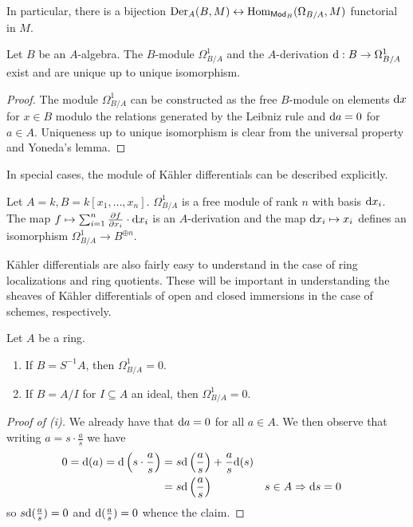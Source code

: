 In particular, there is a bijection $\mathrm{Der}_{A}(B,M)\leftrightarrow\mathrm{Hom}_{\mathsf{Mod}_{B}}(\Omega_{B/A},M)$ functorial in $M$. 
\begin{proposition}\label{prop: uniqueness of differentials}
    Let $B$ be an $A$-algebra. The $B$-module $\Omega^{1}_{B/A}$ and the $A$-derivation $\mathrm{d}:B\to\Omega^{1}_{B/A}$ exist and are unique up to unique isomorphism. 
\end{proposition}
\begin{proof}
    The module $\Omega^{1}_{B/A}$ can be constructed as the free $B$-module on elements $\mathrm{d} x$ for $x\in B$ modulo the relations generated by the Leibniz rule and $\mathrm{d} a=0$ for $a\in A$. Uniqueness up to unique isomorphism is clear from the universal property and Yoneda's lemma. 
\end{proof}
In special cases, the module of K\"{a}hler differentials can be described explicitly. 
\begin{example}
    Let $A=k,B=k[x_{1},\dots,x_{n}]$. $\Omega_{B/A}^{1}$ is a free module of rank $n$ with basis $\mathrm{d} x_{i}$. The map $f\mapsto\sum_{i=1}^{n}\frac{\partial f}{\partial x_{i}}\cdot \mathrm{d} x_{i}$ is an $A$-derivation and the map $\mathrm{d} x_{i}\mapsto x_{i}$ defines an isomorphism $\Omega_{B/A}^{1}\to B^{\oplus n}$. 
\end{example}
K\"{a}hler differentials are also fairly easy to understand in the case of ring localizations and ring quotients. These will be important in understanding the sheaves of K\"{a}hler differentials of open and closed immersions in the case of schemes, respectively. 
\begin{proposition}\label{prop: differentials of open and closed immersions}
    Let $A$ be a ring. 
    \begin{enumerate}[label=(\roman*)]
        \item If $B=S^{-1}A$, then $\Omega^{1}_{B/A}=0$. 
        \item If $B=A/I$ for $I\subseteq A$ an ideal, then $\Omega^{1}_{B/A}=0$. 
    \end{enumerate}
\end{proposition}
\begin{proof}[Proof of (i)]
    We already have that $\mathrm{d} a=0$ for all $a\in A$. We then observe that writing $a=s\cdot\frac{a}{s}$ we have 
    \begin{align*}
        0=\mathrm{d}(a)=\mathrm{d}\left(s\cdot\frac{a}{s}\right) &= s\mathrm{d}\left(\frac{a}{s}\right)+\frac{a}{s}\mathrm{d}(s) \\
        &= s\mathrm{d}\left(\frac{a}{s}\right) && s\in A\Rightarrow \mathrm{d} s=0 
    \end{align*}
    so $s\mathrm{d}(\frac{a}{s})=0$ and $\mathrm{d}(\frac{a}{s})=0$ whence the claim. 
\end{proof}
